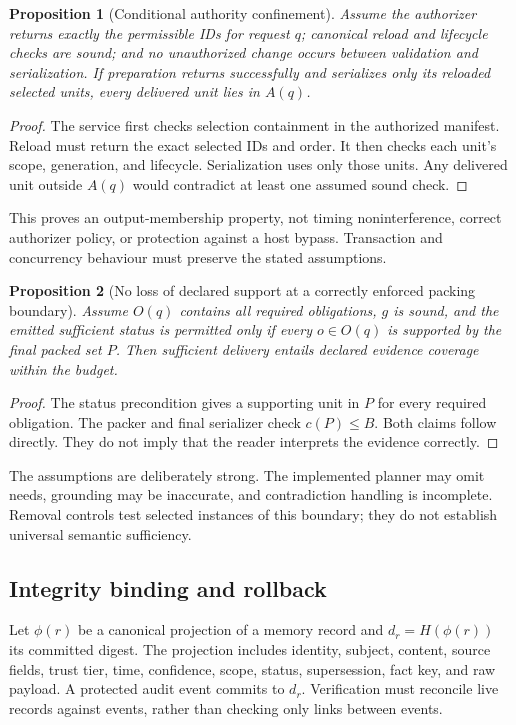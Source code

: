 \documentclass[11pt]{article}
\newtheorem{proposition}{Proposition}
\begin{document}
\begin{proposition}[Conditional authority confinement]
Assume the authorizer returns exactly the permissible IDs for request $q$; canonical reload and lifecycle checks are sound; and no unauthorized change occurs between validation and serialization. If preparation returns successfully and serializes only its reloaded selected units, every delivered unit lies in $A(q)$.
\end{proposition}
\begin{proof}
The service first checks selection containment in the authorized manifest. Reload must return the exact selected IDs and order. It then checks each unit's scope, generation, and lifecycle. Serialization uses only those units. Any delivered unit outside $A(q)$ would contradict at least one assumed sound check.
\end{proof}
This proves an output-membership property, not timing noninterference, correct authorizer policy, or protection against a host bypass. Transaction and concurrency behaviour must preserve the stated assumptions.

\begin{proposition}[No loss of declared support at a correctly enforced packing boundary]
Assume $O(q)$ contains all required obligations, $g$ is sound, and the emitted sufficient status is permitted only if every $o\in O(q)$ is supported by the final packed set $P$. Then sufficient delivery entails declared evidence coverage within the budget.
\end{proposition}
\begin{proof}
The status precondition gives a supporting unit in $P$ for every required obligation. The packer and final serializer check $c(P)\leq B$. Both claims follow directly. They do not imply that the reader interprets the evidence correctly.
\end{proof}
The assumptions are deliberately strong. The implemented planner may omit needs, grounding may be inaccurate, and contradiction handling is incomplete. Removal controls test selected instances of this boundary; they do not establish universal semantic sufficiency.

\subsection{Integrity binding and rollback}
Let $\phi(r)$ be a canonical projection of a memory record and $d_r=H(\phi(r))$ its committed digest. The projection includes identity, subject, content, source fields, trust tier, time, confidence, scope, status, supersession, fact key, and raw payload. A protected audit event commits to $d_r$. Verification must reconcile live records against events, rather than checking only links between events.
\end{document}
